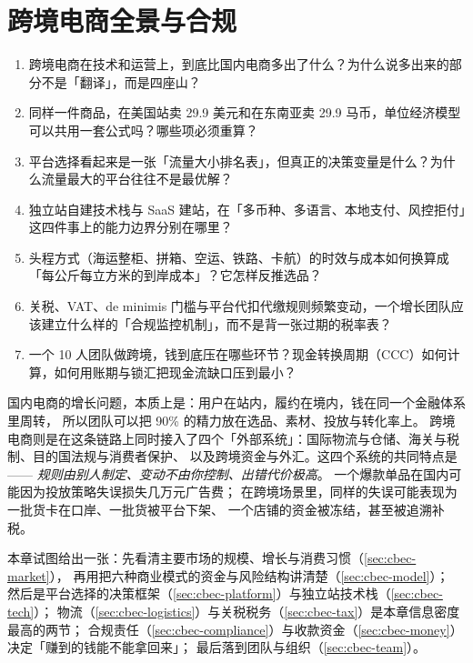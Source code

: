 \chapter{跨境电商全景与合规}
\label{ch:cbec}

\begin{insight}[本章要解决的问题]
\begin{enumerate}
  \item 跨境电商在技术和运营上，到底比国内电商多出了什么？为什么说多出来的部分不是「翻译」，而是四座山？
  \item 同样一件商品，在美国站卖 29.9 美元和在东南亚卖 29.9 马币，单位经济模型可以共用一套公式吗？哪些项必须重算？
  \item 平台选择看起来是一张「流量大小排名表」，但真正的决策变量是什么？为什么流量最大的平台往往不是最优解？
  \item 独立站自建技术栈与 SaaS 建站，在「多币种、多语言、本地支付、风控拒付」这四件事上的能力边界分别在哪里？
  \item 头程方式（海运整柜、拼箱、空运、铁路、卡航）的时效与成本如何换算成「每公斤每立方米的到岸成本」？它怎样反推选品？
  \item 关税、VAT、de minimis 门槛与平台代扣代缴规则频繁变动，一个增长团队应该建立什么样的「合规监控机制」，而不是背一张过期的税率表？
  \item 一个 10 人团队做跨境，钱到底压在哪些环节？现金转换周期（CCC）如何计算，如何用账期与锁汇把现金流缺口压到最小？
\end{enumerate}
\end{insight}

国内电商的增长问题，本质上是：用户在站内，履约在境内，钱在同一个金融体系里周转，
所以团队可以把 90\% 的精力放在选品、素材、投放与转化率上。
跨境电商则是在这条链路上同时接入了四个「外部系统」：国际物流与仓储、海关与税制、目的国法规与消费者保护、
以及跨境资金与外汇。这四个系统的共同特点是——
\emph{规则由别人制定、变动不由你控制、出错代价极高}。
一个爆款单品在国内可能因为投放策略失误损失几万元广告费；
在跨境场景里，同样的失误可能表现为一批货卡在口岸、一批货被平台下架、
一个店铺的资金被冻结，甚至被追溯补税。

本章试图给出一张：先看清主要市场的规模、增长与消费习惯（\cref{sec:cbec-market}），
再用把六种商业模式的资金与风险结构讲清楚（\cref{sec:cbec-model}）；
然后是平台选择的决策框架（\cref{sec:cbec-platform}）与独立站技术栈（\cref{sec:cbec-tech}）；
物流（\cref{sec:cbec-logistics}）与关税税务（\cref{sec:cbec-tax}）是本章信息密度最高的两节；
合规责任（\cref{sec:cbec-compliance}）与收款资金（\cref{sec:cbec-money}）决定「赚到的钱能不能拿回来」；
最后落到团队与组织（\cref{sec:cbec-team}）。

